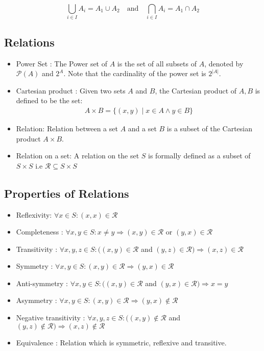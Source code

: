 \documentclass[12pt,a4paper]{article}
\begin{document}
\[\bigcup_{i \in I} A_i=A_1 \cup A_2 \quad \text{and} \quad \bigcap_{i \in I} A_i=A_1 \cap A_2 \]

 \subsection{Relations} 
 \begin{itemize}
    \item Power Set : The Power set of \(A\) is the set of all subsets of \(A\), denoted by \(\mathcal{P}(A)\) and \(2^A\). Note that the cardinality of the power set is \(2^{|A|}\).
    \item Cartesian product : Given two sets \(A\) and \(B\), the Cartesian product of \(A, B\) is defined to be the set:
     \begin{align*}
    A \times B=\{(x, y) \mid x \in A \wedge y \in B\}
    \end{align*}
      \item Relation: Relation between a set \(A\) and a set \(B\) is a subset of the Cartesian product \(A \times B\).
    \item Relation on a set: A relation on the set \(S\) is formally defined as a subset of \(S \times S\) i.e \(\mathcal{R} \subseteq S \times S\)
 \end{itemize}

  \subsection{Properties of Relations} 
  \begin{itemize}
    \item  Reflexivity: \(\forall x \in S:(x, x) \in \mathcal{R}\)
    \item Completeness : \(\forall x, y \in S: x \neq y \Rightarrow(x, y) \in \mathcal{R}\) or \((y, x) \in \mathcal{R}\)
    \item Transitivity : \(\forall x, y, z \in S:((x, y) \in \mathcal{R}\) and \((y, z) \in \mathcal{R}) \Rightarrow(x, z) \in \mathcal{R}\)
    \item Symmetry : \(\forall x, y \in S:(x, y) \in \mathcal{R} \Rightarrow(y, x) \in \mathcal{R}\)
    \item Anti-symmetry : \(\forall x, y \in S:((x, y) \in \mathcal{R}\) and \((y, x) \in \mathcal{R}) \Rightarrow x=y\)
    \item Asymmetry : \(\forall x, y \in S:(x, y) \in \mathcal{R} \Rightarrow(y, x) \notin \mathcal{R}\)
    \item Negative transitivity : \(\forall x, y, z \in S:((x, y) \notin \mathcal{R}\) and \((y, z) \notin \mathcal{R}) \Rightarrow(x, z) \notin \mathcal{R}\)
    \item Equivalence : Relation which is symmetric, reflexive and transitive.
  \end{itemize}
\end{document}
